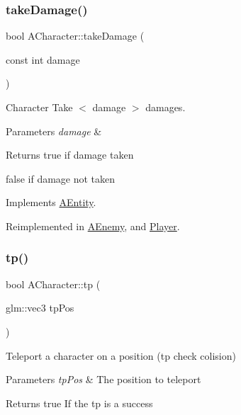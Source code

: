 \subsubsection{\texorpdfstring{take\+Damage()}{takeDamage()}}
{\footnotesize\ttfamily bool A\+Character\+::take\+Damage (\begin{DoxyParamCaption}\item[{const int}]{damage }\end{DoxyParamCaption})\hspace{0.3cm}{\ttfamily [virtual]}}



Character Take $<$ damage $>$ damages. 


\begin{DoxyParams}{Parameters}
{\em damage} & \\
\hline
\end{DoxyParams}
\begin{DoxyReturn}{Returns}
true if damage taken 

false if damage not taken 
\end{DoxyReturn}


Implements \hyperlink{class_a_entity_ac01e24195a8ba249c855120ac017770e}{A\+Entity}.



Reimplemented in \hyperlink{class_a_enemy_a17bcf116c42c3d780e243127adf1a947}{A\+Enemy}, and \hyperlink{class_player_a029b1d511340697d8ccfb7bfa604435b}{Player}.

\mbox{\label{class_a_character_a295783a792eedc09bcd68bc98eacb6d5}} 
\subsubsection{\texorpdfstring{tp()}{tp()}}
{\footnotesize\ttfamily bool A\+Character\+::tp (\begin{DoxyParamCaption}\item[{glm\+::vec3}]{tp\+Pos }\end{DoxyParamCaption})}



Teleport a character on a position (tp check colision) 


\begin{DoxyParams}{Parameters}
{\em tp\+Pos} & The position to teleport \\
\hline
\end{DoxyParams}
\begin{DoxyReturn}{Returns}
true If the tp is a success 
\end{DoxyReturn}
\mbox{\label{class_a_character_af5a4d00f6104d45b821a2e88b80936b5}} 
